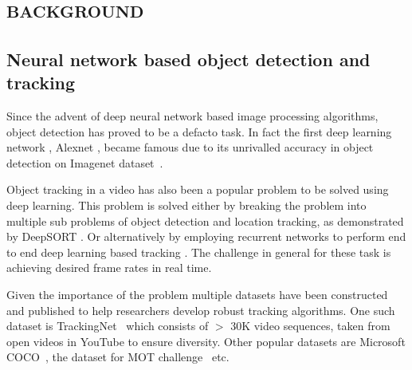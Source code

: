 \section{\textsc{background}}

\subsection{Neural network based object detection and tracking}

Since the advent of deep neural network based image processing algorithms, object detection has proved to be a defacto task. 
In fact the first deep learning network , Alexnet \cite{alexnet}, became famous due to its unrivalled accuracy in object detection on Imagenet dataset~\cite{imagenet}.

Object tracking in a video has also been a popular problem to be solved using deep learning. 
This problem is solved either by breaking the problem into multiple sub problems of object detection and location tracking, as demonstrated by DeepSORT \cite{deepsort}. Or alternatively by employing recurrent networks to perform end to end deep learning based tracking \cite{rolo}. The challenge in general for these task is achieving desired frame rates in real time. 


Given the importance of the problem multiple datasets have been constructed and published to help researchers develop robust tracking algorithms. 
One such dataset is TrackingNet~\cite{trackingnet} which consists of $>$ 30K video sequences, taken from open videos in YouTube to ensure diversity. 
Other popular datasets are Microsoft COCO~\cite{microsoftcoco}, the dataset for MOT challenge~\cite{motchallenge} etc. 